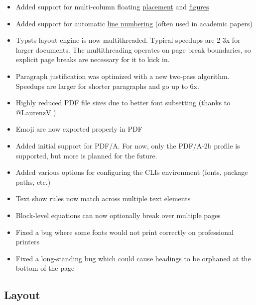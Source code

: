 \begin{itemize}
\tightlist
\item
  Added support for multi-column floating
  \href{/docs/reference/layout/place/\#parameters-scope}{placement} and
  \href{/docs/reference/model/figure/\#parameters-scope}{figures}
\item
  Added support for automatic
  \href{/docs/reference/model/par/\#definitions-line}{line numbering}
  (often used in academic papers)
\item
  Typst\textquotesingle s layout engine is now multithreaded. Typical
  speedups are 2-3x for larger documents. The multithreading operates on
  page break boundaries, so explicit page breaks are necessary for it to
  kick in.
\item
  Paragraph justification was optimized with a new two-pass algorithm.
  Speedups are larger for shorter paragraphs and go up to 6x.
\item
  Highly reduced PDF file sizes due to better font subsetting (thanks to
  \href{https://github.com/LaurenzV}{@LaurenzV} )
\item
  Emoji are now exported properly in PDF
\item
  Added initial support for PDF/A. For now, only the PDF/A-2b profile is
  supported, but more is planned for the future.
\item
  Added various options for configuring the CLI\textquotesingle s
  environment (fonts, package paths, etc.)
\item
  Text show rules now match across multiple text elements
\item
  Block-level equations can now optionally break over multiple pages
\item
  Fixed a bug where some fonts would not print correctly on professional
  printers
\item
  Fixed a long-standing bug which could cause headings to be orphaned at
  the bottom of the page
\end{itemize}

\subsection{Layout}\label{layout}

